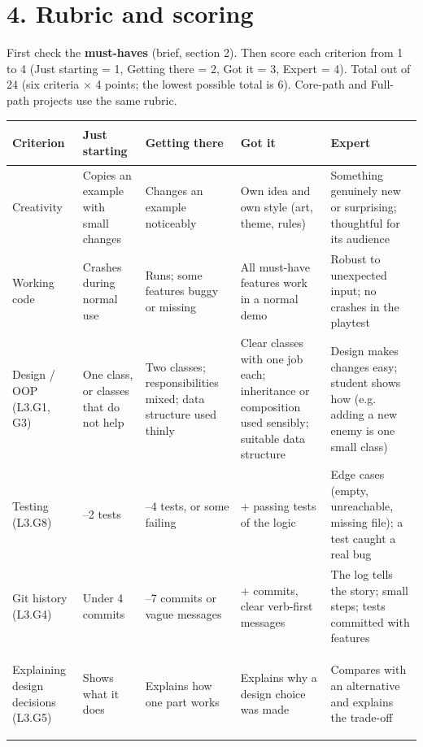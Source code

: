 \documentclass[level=3,teacher]{kidscode}
\begin{document}
\section{4. Rubric and scoring}

First check the \textbf{must-haves} (brief, section 2). Then score each criterion from 1 to 4
(Just starting = 1, Getting there = 2, Got it = 3, Expert = 4). Total out of 24 (six criteria
$\times$ 4 points; the lowest possible total is 6). Core-path and Full-path projects use the same
rubric.

\begingroup\small
\renewcommand{\arraystretch}{1.3}
\begin{longtable}{@{}>{\bfseries\raggedright\arraybackslash}p{2.2cm}>{\raggedright\arraybackslash}p{3.15cm}>{\raggedright\arraybackslash}p{3.15cm}>{\raggedright\arraybackslash}p{3.15cm}>{\raggedright\arraybackslash}p{\dimexpr\linewidth-11.65cm-8\tabcolsep}@{}}
\toprule
\rowcolor{kcaccent!15} Criterion & 1 Just starting & 2 Getting there & 3 Got it & 4 Expert\\ \midrule\endhead
\bottomrule\endfoot
Creativity & Copies an example with small changes & Changes an example noticeably & Own idea and
own style (art, theme, rules) & Something genuinely new or surprising; thoughtful for its audience\\ \midrule
Working code & Crashes during normal use & Runs; some features buggy or missing & All must-have
features work in a normal demo & Robust to unexpected input; no crashes in the playtest\\ \midrule
Design / OOP (L3.G1, G3) & One class, or classes that do not help & Two classes; responsibilities
mixed; data structure used thinly & Clear classes with one job each; inheritance or composition
used sensibly; suitable data structure & Design makes changes easy; student shows how (e.g.
adding a new enemy is one small class)\\ \midrule
Testing (L3.G8) & 0--2 tests & 3--4 tests, or some failing & 5+ passing tests of the logic & Edge
cases (empty, unreachable, missing file); a test caught a real bug\\ \midrule
Git history (L3.G4) & Under 4 commits & 4--7 commits or vague messages & 8+ commits, clear verb-first
messages & The log tells the story; small steps; tests committed with features\\ \midrule
Explaining design decisions (L3.G5) & Shows what it does & Explains how one part works & Explains
why a design choice was made & Compares with an alternative and explains the trade-off\\
\end{longtable}
\endgroup
\end{document}
